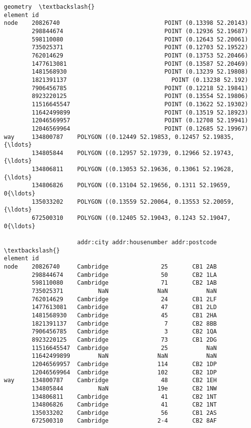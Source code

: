 \documentclass[11pt]{article}
\makeatletter
\newcommand{\boxspacing}{\kern\kvtcb@left@rule\kern\kvtcb@boxsep}
\newcommand{\prompt}[4]{
        {\ttfamily\llap{{\color{#2}[#3]:\hspace{3pt}#4}}\vspace{-\baselineskip}}
    }
\makeatother
\begin{document}
            \begin{tcolorbox}[breakable, size=fbox, boxrule=.5pt, pad at break*=1mm, opacityfill=0]
\prompt{Out}{outcolor}{13}{\boxspacing}
\begin{Verbatim}[commandchars=\\\{\}]
                                                              geometry  \textbackslash{}
element id
node    20826740                              POINT (0.13398 52.20143)
        298844674                             POINT (0.12936 52.19687)
        598110080                             POINT (0.12643 52.20061)
        735025371                             POINT (0.12703 52.19522)
        762014629                             POINT (0.13753 52.20466)
        1477613081                            POINT (0.13587 52.20469)
        1481568930                            POINT (0.13239 52.19808)
        1821391137                              POINT (0.13238 52.192)
        7906456785                            POINT (0.12218 52.19841)
        8923220125                            POINT (0.13554 52.19806)
        11516645547                           POINT (0.13622 52.19302)
        11642499899                           POINT (0.13519 52.18923)
        12046569957                           POINT (0.12708 52.19941)
        12046569964                           POINT (0.12685 52.19967)
way     134800787    POLYGON ((0.12449 52.19853, 0.12457 52.19835, {\ldots}
        134805844    POLYGON ((0.12957 52.19739, 0.12966 52.19743, {\ldots}
        134806811    POLYGON ((0.13053 52.19636, 0.13061 52.19628, {\ldots}
        134806826    POLYGON ((0.13104 52.19656, 0.1311 52.19659, 0{\ldots}
        135033202    POLYGON ((0.13559 52.20064, 0.13553 52.20059, {\ldots}
        672500310    POLYGON ((0.12405 52.19043, 0.1243 52.19047, 0{\ldots}

                     addr:city addr:housenumber addr:postcode  \textbackslash{}
element id
node    20826740     Cambridge               25       CB1 2AB
        298844674    Cambridge               50       CB2 1LA
        598110080    Cambridge               71       CB2 1AB
        735025371          NaN              NaN           NaN
        762014629    Cambridge               24       CB1 2LF
        1477613081   Cambridge               47       CB1 2LD
        1481568930   Cambridge               45       CB1 2HA
        1821391137   Cambridge                7       CB2 8BB
        7906456785   Cambridge                3       CB2 1QA
        8923220125   Cambridge               73       CB1 2DG
        11516645547  Cambridge               25           NaN
        11642499899        NaN              NaN           NaN
        12046569957  Cambridge              114       CB2 1DP
        12046569964  Cambridge              102       CB2 1DP
way     134800787    Cambridge               48       CB2 1EH
        134805844          NaN              19e       CB2 1NW
        134806811    Cambridge               41       CB2 1NT
        134806826    Cambridge               41       CB2 1NT
        135033202    Cambridge               56       CB1 2AS
        672500310    Cambridge              2-4       CB2 8AF


\end{Verbatim}
\end{tcolorbox}
\end{document}
